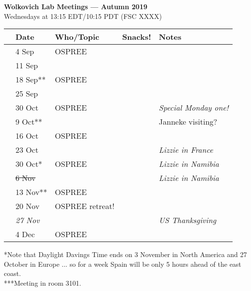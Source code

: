 \documentclass[11pt]{article}
\begin{document}
 
\raggedright
{}

\begin{center} 
{\large \textbf{Wolkovich Lab Meetings --- Autumn 2019}} \\ [2pt]
Wednesdays at 13:15 EDT/10:15 PDT (FSC XXXX)\\
\end{center} 

\begin{center}
\begin{tabular}{ p{0.2 cm}  p{2 cm}  p{5 cm}  p{2 cm}  p{4 cm} }  \hline \hline
 & \textbf{Date}
   & \textbf{Who/Topic}
      & \textbf{Snacks!} 
         & \textbf{Notes} \\ 
\hline \hline
 & 4 Sep & OSPREE &       &  \\\hline
 & 11 Sep & &       &  \\\hline
 & 18 Sep** & OSPREE &       & \\\hline  
 & 25 Sep & &       &  \\\hline
 & 30 Oct & OSPREE &       &  \emph{Special Monday one!}\\\hline
 & 9 Oct** & &     & Janneke visiting? \\\hline
 & 16 Oct& OSPREE &       &  \\\hline %
 & 23 Oct  & &       & \emph{Lizzie in France}  \\\hline
 & 30 Oct* & OSPREE &   & \emph{Lizzie in Namibia}     \\\hline
 & \sout{6 Nov} &  &       &  \emph{Lizzie in Namibia}  \\\hline
 & 13 Nov** & OSPREE &       &  \\\hline
 & 20 Nov & OSPREE retreat!&       &  \\\hline
 & \emph{27 Nov} & &   & \emph{US Thanksgiving} \\\hline
 & 4 Dec & OSPREE &    & \\\hline


\hline
\end{tabular}
\end{center}
*Note that Daylight Davings Time ends on 3 November in North America and 27 October in Europe ... so for a week Spain will be only 5 hours ahead of the east coast.\\
***Meeting in room 3101.
\vspace{10pt}\\
\end{document}
